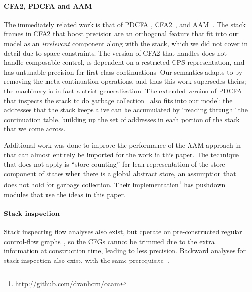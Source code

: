 \paragraph{CFA2, PDCFA and AAM}
The immediately related work is that of PDCFA \citep{dvanhorn:Earl2010Pushdown, dvanhorn:Earl2012Introspective}, CFA2~\citep{ianjohnson:vardoulakis-lmcs11, ianjohnson:Vardoulakis2011Pushdown}, and AAM~\citep{dvanhorn:VanHorn2010Abstracting}.
%
The stack frames in CFA2 that boost precision are an orthogonal feature that fit into our model as an \emph{irrelevant} component along with the stack, which we did not cover in detail due to space constraints.
%
The version of CFA2 that handles  does not handle composable control, is dependent on a restricted CPS representation, and has untunable precision for first-class continuations.
%
Our semantics adapts to  by removing the meta-continuation operations, and thus this work supersedes theirs; the machinery is in fact a strict generalization.
%
The extended version of PDCFA that inspects the stack to do garbage collection~\citep{dvanhorn:Earl2012Introspective} also fits into our model;
the addresses that the stack keeps alive can be accumulated by ``reading through'' the continuation table, building up the set of addresses in each portion of the stack that we come across.
%

Additional work was done to improve the performance of the AAM approach in \citet{ianjohnson:oaam:icfp2013} that can almost entirely be imported for the work in this paper.
%
The technique that does not apply is ``store counting'' for lean representation of the store component of states when there is a global abstract store, an assumption that does not hold for garbage collection.
%
Their implementation\footnote{\url{http://github.com/dvanhorn/oaam}} has pushdown modules that use the ideas in this paper.

\paragraph{Stack inspection}
Stack inspecting flow analyses also exist, but operate on pre-constructed regular control-flow graphs~\citep{ianjohnson:bartoletti2004stack}, so the CFGs cannot be trimmed due to the extra information at construction time, leading to less precision.
%
Backward analyses for stack inspection also exist, with the same prerequisite~\citep{ianjohnson:DBLP:journals/sigplan/Chang06}.

